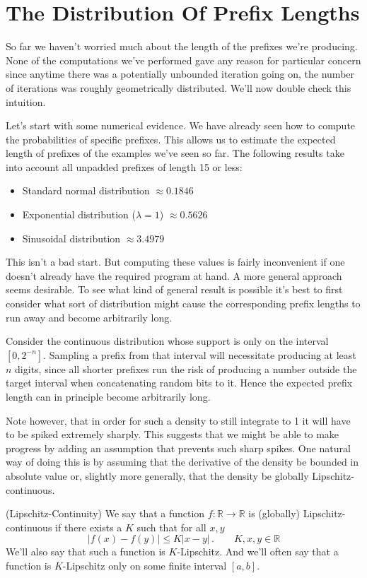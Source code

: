 \section{The Distribution Of Prefix Lengths}

So far we haven't worried much about the length of the prefixes we're producing. None of the computations we've performed gave any reason for particular concern since anytime there was a potentially unbounded iteration going on, the number of iterations was roughly geometrically distributed. We'll now double check this intuition.

Let's start with some numerical evidence. We have already seen how to compute the probabilities of specific prefixes. This allows us to estimate the expected length of prefixes of the examples we've seen so far. The following results take into account all unpadded prefixes of length 15 or less:
\begin{itemize}
	\item Standard normal distribution $\approx 0.1846$
	\item Exponential distribution ($\lambda = 1$) $\approx 0.5626$
	\item Sinusoidal distribution $\approx 3.4979$
\end{itemize}
This isn't a bad start. But computing these values is fairly inconvenient if one doesn't already have the required program at hand. A more general approach seems desirable. To see what kind of general result is possible it's best to first consider what sort of distribution might cause the corresponding prefix lengths to run away and become arbitrarily long.

Consider the continuous distribution whose support is only on the interval $[0,2^{-n}]$. Sampling a prefix from that interval will necessitate producing at least $n$ digits, since all shorter prefixes run the risk of producing a number outside the target interval when concatenating random bits to it. Hence the expected prefix length can in principle become arbitrarily long.

Note however, that in order for such a density to still integrate to 1 it will have to be spiked extremely sharply. This suggests that we might be able to make progress by adding an assumption that prevents such sharp spikes. One natural way of doing this is by assuming that the derivative of the density be bounded in absolute value or, slightly more generally, that the density be globally Lipschitz-continuous.

\begin{definition}{(Lipschitz-Continuity)}
	We say that a function $f:\mathbb{R}\rightarrow\mathbb{R}$ is (globally) Lipschitz-continuous if there exists a $K$ such that for all $x, y$
	\[
	|f(x)-f(y)| \leq K|x-y|\,. \qquad K,x,y\in\mathbb{R}
	\]
	We'll also say that such a function is $K$-Lipschitz. And we'll often say that a function is $K$-Lipschitz only on some finite interval $[a,b]$.
\end{definition}

